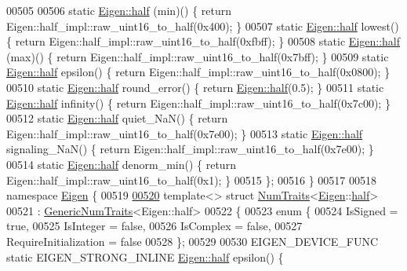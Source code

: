 \begin{DoxyCode}
00505 
00506   \textcolor{keyword}{static} \hyperlink{struct_eigen_1_1half}{Eigen::half} (min)() \{ \textcolor{keywordflow}{return} Eigen::half\_impl::raw\_uint16\_to\_half(0x400); \}
00507   \textcolor{keyword}{static} \hyperlink{struct_eigen_1_1half}{Eigen::half} lowest() \{ \textcolor{keywordflow}{return} Eigen::half\_impl::raw\_uint16\_to\_half(0xfbff); \}
00508   \textcolor{keyword}{static} \hyperlink{struct_eigen_1_1half}{Eigen::half} (max)() \{ \textcolor{keywordflow}{return} Eigen::half\_impl::raw\_uint16\_to\_half(0x7bff); \}
00509   \textcolor{keyword}{static} \hyperlink{struct_eigen_1_1half}{Eigen::half} epsilon() \{ \textcolor{keywordflow}{return} Eigen::half\_impl::raw\_uint16\_to\_half(0x0800); \}
00510   \textcolor{keyword}{static} \hyperlink{struct_eigen_1_1half}{Eigen::half} round\_error() \{ \textcolor{keywordflow}{return} \hyperlink{struct_eigen_1_1half}{Eigen::half}(0.5); \}
00511   \textcolor{keyword}{static} \hyperlink{struct_eigen_1_1half}{Eigen::half} infinity() \{ \textcolor{keywordflow}{return} Eigen::half\_impl::raw\_uint16\_to\_half(0x7c00); \}
00512   \textcolor{keyword}{static} \hyperlink{struct_eigen_1_1half}{Eigen::half} quiet\_NaN() \{ \textcolor{keywordflow}{return} Eigen::half\_impl::raw\_uint16\_to\_half(0x7e00); \}
00513   \textcolor{keyword}{static} \hyperlink{struct_eigen_1_1half}{Eigen::half} signaling\_NaN() \{ \textcolor{keywordflow}{return} Eigen::half\_impl::raw\_uint16\_to\_half(0x7e00); \}
00514   \textcolor{keyword}{static} \hyperlink{struct_eigen_1_1half}{Eigen::half} denorm\_min() \{ \textcolor{keywordflow}{return} Eigen::half\_impl::raw\_uint16\_to\_half(0x1); \}
00515 \};
00516 \}
00517 
00518 \textcolor{keyword}{namespace }\hyperlink{namespace_eigen}{Eigen} \{
00519 
\hyperlink{struct_eigen_1_1_num_traits_3_01_eigen_1_1half_01_4}{00520} \textcolor{keyword}{template}<> \textcolor{keyword}{struct }\hyperlink{group___core___module_struct_eigen_1_1_num_traits}{NumTraits}<\hyperlink{namespace_eigen}{Eigen}::\hyperlink{struct_eigen_1_1half}{half}>
00521     : \hyperlink{struct_eigen_1_1_generic_num_traits}{GenericNumTraits}<Eigen::half>
00522 \{
00523   \textcolor{keyword}{enum} \{
00524     IsSigned = \textcolor{keyword}{true},
00525     IsInteger = \textcolor{keyword}{false},
00526     IsComplex = \textcolor{keyword}{false},
00527     RequireInitialization = \textcolor{keyword}{false}
00528   \};
00529 
00530   EIGEN\_DEVICE\_FUNC \textcolor{keyword}{static} EIGEN\_STRONG\_INLINE \hyperlink{struct_eigen_1_1half}{Eigen::half} epsilon() \{

\end{DoxyCode}
